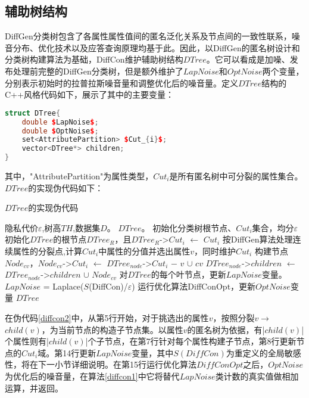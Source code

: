 \subsection{辅助树结构}

DiffGen分类树包含了各属性属性值间的匿名泛化关系及节点间的一致性联系，噪音分布、优化技术以及应答查询原理均基于此。因此，以DiffGen的匿名树设计和分类树构建算法为基础，DiffCon维护辅助树结构$DTree$。它可以看成是加噪、发布处理前完整的DiffGen分类树，但是额外维护了$LapNoise$和$OptNoise$两个变量，分别表示初始时的拉普拉斯噪音量和调整优化后的噪音量。定义$DTree$结构的C++风格代码如下，展示了其中的主要变量：

\begin{lstlisting}[language={C++}, caption={DTree结构关键代码}]
struct DTree{
	double $LapNoise$;
	double $OptNoise$;
	set<AttributePartition> $Cut_{i}$;
	vector<DTree*> children;
}
\end{lstlisting}
其中，"AttributePartition"为属性类型，$Cut_{i}$是所有匿名树中可分裂的属性集合。$DTree$的实现伪代码如下：

\begin{algorithm}
	\caption{$DTree$的实现伪代码} 
	\label{diffcon2}
	\begin{algorithmic}[1]
		\REQUIRE 隐私代价$\varepsilon$,树高$TH$,数据集$D$。
		\ENSURE $DTree$。
		\STATE 初始化分类树根节点、$Cut_{i}$集合，均分$\varepsilon$
		\STATE 初始化$DTree$的根节点$DTree_{R}$，且$DTree_{R}$->$Cut_{i}$ $\leftarrow$ $Cut_{i}$
		\STATE 按DiffGen算法处理连续属性的分裂点,计算$Cut_{i}$中属性的分值并选出属性$v$，同时维护$Cut_{i}$
		\STATE 构建节点$Node_{cv}$，$Node_{cv}$->$Cut_{i}$ $\leftarrow$ $DTree_{node}$->$Cut_{i}$ $ - $ $v$ $\cup$ $cv$
		\STATE $DTree_{node}$->$children$ $\leftarrow$ $DTree_{node}$->$children$ $\cup$ $Node_{cv}$
		\ENDFOR
		\ENDIF 
		\ENDFOR
		\ENDFOR
		\STATE 对$DTree$的每个叶节点，更新$LapNoise$变量。$LapNoise$ = Laplace($S$(DiffCon)/$\varepsilon$)
		\STATE 运行优化算法DiffConOpt，更新$OptNoise$变量
		\RETURN $DTree$
	\end{algorithmic}
\end{algorithm} 

在伪代码\ref{diffcon2}中，从第5行开始，对于挑选出的属性$v$，按照分裂$v$$\rightarrow$$child(v)$，为当前节点的构造子节点集。以属性$v$的匿名树为依据，有|$child(v)$|个属性则有|$child(v)$|个子节点，在第7行针对每个属性构建子节点，第8行更新节点的$Cut_{i}$域。第14行更新$LapNoise$变量，其中$S(DiffCon)$为重定义的全局敏感性，将在下一小节详细说明。在第15行运行优化算法$DiffConOpt$之后，$OptNoise$为优化后的噪音量，在算法\ref{diffcon1}中它将替代$LapNoise$类计数的真实值做相加运算，并返回。

